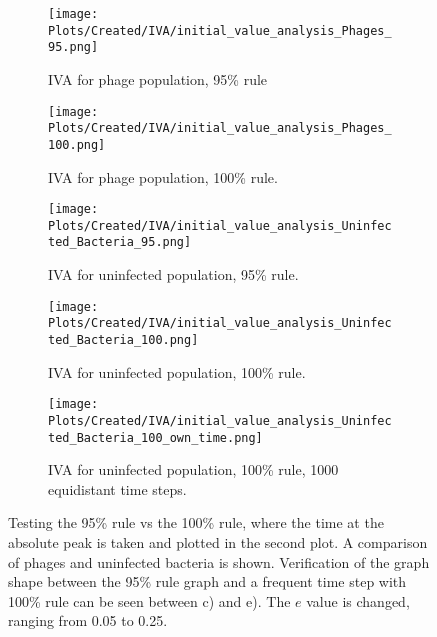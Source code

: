 \begin{figure}
    \centering
    \begin{subfigure}{1\linewidth}
        \centering
        \texttt{[image: Plots/Created/IVA/initial\_value\_analysis\_Phages\_95.png]}
        \caption{
            IVA for phage population, 95\% rule
        }
        \label{fig:appendixF:IVA_phage_95}
    \end{subfigure}
    \hfill
    \begin{subfigure}{1\linewidth}
        \centering
        \texttt{[image: Plots/Created/IVA/initial\_value\_analysis\_Phages\_100.png]}
        \caption{
            IVA for phage population, 100\% rule.  
        }
        \label{fig:appendixF:IVA_phages_100}
    \end{subfigure}
    \hfill
    \begin{subfigure}{1\linewidth}
        \centering
        \texttt{[image: Plots/Created/IVA/initial\_value\_analysis\_Uninfected\_Bacteria\_95.png]}
        \caption{
            IVA for uninfected population, 95\% rule. 
        }
        \label{fig:appendixF:IVA_uninfected_bacteria_95}
    \end{subfigure}
    \hfill 
    \begin{subfigure}{1\linewidth}
        \centering
        \texttt{[image: Plots/Created/IVA/initial\_value\_analysis\_Uninfected\_Bacteria\_100.png]}
        \caption{
            IVA for uninfected population, 100\% rule. 
        }
        \label{fig:appendixF:IVA_uninfected_bacteria_100}
    \end{subfigure}
    \begin{subfigure}{1\linewidth}
        \centering
        \texttt{[image: Plots/Created/IVA/initial\_value\_analysis\_Uninfected\_Bacteria\_100\_own\_time.png]}
        \caption{
            IVA for uninfected population, 100\% rule, 1000 equidistant time steps. 
        }
        \label{fig:appendixF:IVA_uninfected_bacteria_100_own_time}
    \end{subfigure}
    \caption{
        Testing the 95\% rule vs the 100\% rule, where the time at the absolute peak is taken and plotted in the second plot. 
        A comparison of phages and uninfected bacteria is shown. 
        Verification of the graph shape between the 95\% rule graph and a frequent time step with 100\% rule can be seen between c) and e). 
        The $e$ value is changed, ranging from 0.05 to 0.25. 
    }
    \label{fig:appendixF:IVA_95_vs_100}
\end{figure}

